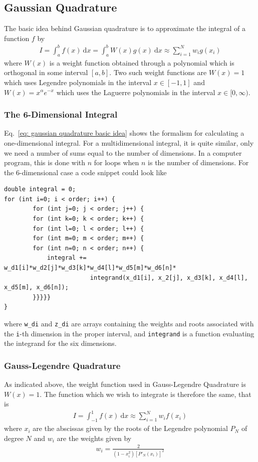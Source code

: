 \documentclass[twoside, 11pt]{article}
\renewcommand{\d}{\mathrm{d}}
\begin{document}
	\subsection{Gaussian Quadrature}
		The basic idea behind Gaussian quadrature is to approximate the integral of a function $f$ by
		\begin{align}
			I = \int_{a}^{b} f(x) \ \d x  = \int_{a}^{b} W(x)g(x) \ \d x \approx \sum_{i=1}^N w_i g(x_i) \label{eq: gaussian quadrature basic idea}
		\end{align}
		where $W(x)$ is a weight function obtained through a polynomial which is orthogonal in some interval $[a, b]$. Two such weight functions are $W(x)=1$ which uses Legendre polynomials in the interval $x\in[-1, 1]$ and $W(x) = x^\alpha e^{-x}$ which uses the Laguerre polynomials in the interval $x \in [0, \infty)$. 
		
		\subsubsection{The 6-Dimensional Integral}\label{section: the 6-dimensional integral}
			Eq.~\eqref{eq: gaussian quadrature basic idea} shows the formalism for calculating a one-dimensional integral. For a multidimensional integral, it is quite similar, only we need a number of sums equal to the number of dimensions. In a computer program, this is done with $n$ for loops when $n$ is the number of dimensions. For the 6-dimensional case a code snippet could look like
			
			\begin{lstlisting}
double integral = 0;
for (int i=0; i < order; i++) {
		for (int j=0; j < order; j++) {
		for (int k=0; k < order; k++) {
		for (int l=0; l < order; l++) {
		for (int m=0; m < order; m++) {
		for (int n=0; n < order; n++) {
			integral += w_d1[i]*w_d2[j]*w_d3[k]*w_d4[l]*w_d5[m]*w_d6[n]*
						integrand(x_d1[i], x_2[j], x_d3[k], x_d4[l], x_d5[m], x_d6[n]);
		}}}}}
}
			\end{lstlisting}
			where \texttt{w\_di} and \texttt{z\_di} are arrays containing the weights and roots associated with the \texttt{i}-th dimension in the proper interval, and \texttt{integrand} is a function evaluating the integrand for the six dimensions. 
			
		
		\subsubsection{Gauss-Legendre Quadrature}
			As indicated above, the weight function used in Gauss-Legendre Quadrature is $W(x)=1$. The function which we wish to integrate is therefore the same, that is
			\begin{align}
				I = \int_{-1}^{1} f(x) \ \d x \approx \sum_{i=1}^N w_i f(x_i)
			\end{align}
			where $x_i$ are the abscissas  given by the roots of the Legendre polynomial $P_N$ of degree $N$ and $w_i$ are the weights given by
			\begin{align*}
				w_i = \frac{2}{(1-x_i^2)[P'_N(x_i)]^2}
			\end{align*}
			
\end{document}
